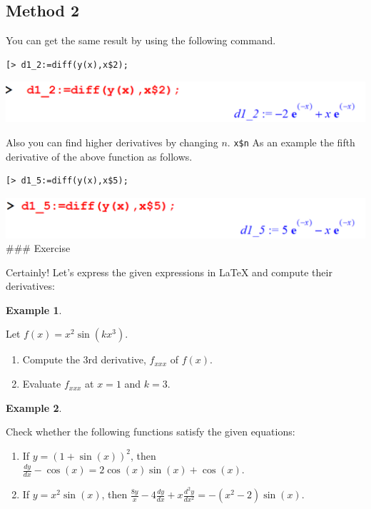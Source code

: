 \documentclass[
]{book}
\providecommand{\tightlist}{%
  \setlength{\itemsep}{0pt}\setlength{\parskip}{0pt}}
\theoremstyle{definition}
\theoremstyle{definition}
\newtheorem{example}{Example}[chapter]
\theoremstyle{definition}
\theoremstyle{definition}
\theoremstyle{remark}
\begin{document}
\subsection{Method 2}\label{method-2}

You can get the same result by using the following command.

\begin{verbatim}
[> d1_2:=diff(y(x),x$2);
\end{verbatim}

\includegraphics{figures/Diff/Diff 6.2 -2.png}

Also you can find higher derivatives by changing \(n\). \texttt{x\$n} As an example the fifth derivative of the above function as follows.

\begin{verbatim}
[> d1_5:=diff(y(x),x$5);
\end{verbatim}

\includegraphics{figures/Diff/Diff 6.2 -3.png}
\#\#\# Exercise

Certainly! Let's express the given expressions in LaTeX and compute their derivatives:

\begin{example}
\protect\hypertarget{exm:unnamed-chunk-44}{}\label{exm:unnamed-chunk-44}

Let \(f(x) = x^2 \sin(kx^3)\).

\begin{enumerate}
\def\labelenumi{(\roman{enumi})}
\tightlist
\item
  Compute the 3rd derivative, \(f_{xxx}\) of \(f(x)\).
\item
  Evaluate \(f_{xxx}\) at \(x = 1\) and \(k = 3\).
\end{enumerate}

\end{example}

\begin{example}
\protect\hypertarget{exm:unnamed-chunk-45}{}\label{exm:unnamed-chunk-45}

Check whether the following functions satisfy the given equations:

\begin{enumerate}
\def\labelenumi{(\roman{enumi})}
\tightlist
\item
  If \(y = {(1 + \sin(x))^2}\), then \(\frac{dy}{dx} - \cos(x) = 2\cos(x)\sin(x) + \cos(x)\).
\item
  If \(y = x^2 \sin(x)\), then \(\frac{8y}{x} - 4\frac{dy}{dx} + x\frac{d^2y}{dx^2} = -(x^2 - 2)\sin(x)\).
\end{enumerate}

\end{example}
\end{document}
